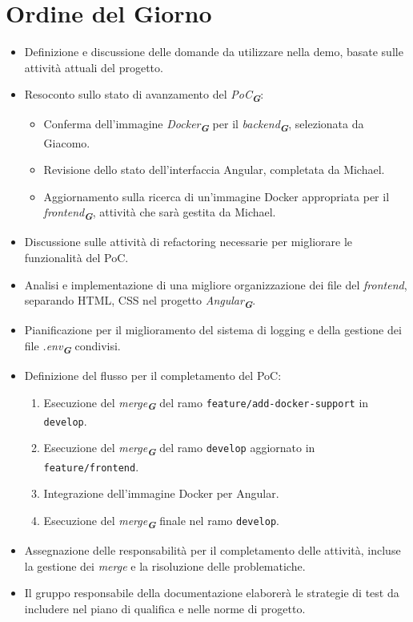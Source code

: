 \section{Ordine del Giorno}

\begin{itemize}
    \item Definizione e discussione delle domande da utilizzare nella demo, basate sulle attività attuali del progetto.
    \item Resoconto sullo stato di avanzamento del \emph{PoC}\textsubscript{\textit{\textbf{G}}}:
    \begin{itemize}
        \item Conferma dell'immagine \emph{Docker}\textsubscript{\textit{\textbf{G}}} per il \emph{backend}\textsubscript{\textit{\textbf{G}}}, selezionata da Giacomo.
        \item Revisione dello stato dell'interfaccia Angular, completata da Michael.
        \item Aggiornamento sulla ricerca di un'immagine Docker appropriata per il \emph{frontend}\textsubscript{\textit{\textbf{G}}}, attività che sarà gestita da Michael.
    \end{itemize}
    \item Discussione sulle attività di refactoring necessarie per migliorare le funzionalità del PoC.
    \item Analisi e implementazione di una migliore organizzazione dei file del \emph{frontend}, separando HTML, CSS nel progetto \emph{Angular}\textsubscript{\textit{\textbf{G}}}.
    \item Pianificazione per il miglioramento del sistema di logging e della gestione dei file \emph{.env}\textsubscript{\textit{\textbf{G}}} condivisi.
    \item Definizione del flusso per il completamento del PoC:
    \begin{enumerate}
        \item Esecuzione del \emph{merge}\textsubscript{\textit{\textbf{G}}} del ramo \texttt{feature/add-docker-support} in \texttt{develop}.
        \item Esecuzione del \emph{merge}\textsubscript{\textit{\textbf{G}}} del ramo \texttt{develop} aggiornato in \texttt{feature/frontend}.
        \item Integrazione dell'immagine Docker per Angular.
        \item Esecuzione del \emph{merge}\textsubscript{\textit{\textbf{G}}} finale nel ramo \texttt{develop}.
    \end{enumerate}
    \item Assegnazione delle responsabilità per il completamento delle attività, incluse la gestione dei \emph{merge} e la risoluzione delle problematiche.
    \item Il gruppo responsabile della documentazione elaborerà le strategie di test da includere nel piano di qualifica e nelle norme di progetto.
\end{itemize}
